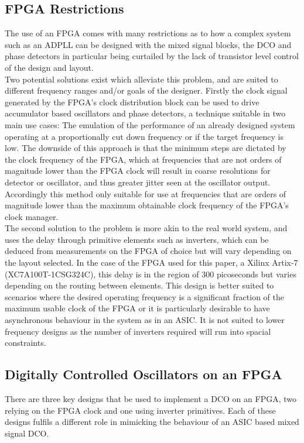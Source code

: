 \documentclass[conference]{IEEEtran}
\begin{document}
\subsection{FPGA Restrictions}
The use of an FPGA comes with many restrictions as to how a complex system such as an ADPLL can be designed with the mixed signal blocks, the DCO and phase detectors in particular being curtailed by the lack of transistor level control of the design and layout.\\
Two potential solutions exist which alleviate this problem, and are suited to different frequency ranges and/or goals of the designer. Firstly the clock signal generated by the FPGA's clock distribution block can be used to drive accumulator based oscillators and phase detectors, a technique suitable in two main use cases: The emulation of the performance of an already designed system operating at a proportionally cut down frequency or if the target frequency is low. 
The downside of this approach is that the minimum steps are dictated by the clock frequency of the FPGA, which at frequencies that are not orders of magnitude lower than the FPGA clock will result in coarse resolutions for detector or oscillator, and thus greater jitter seen at the oscillator output.
Accordingly this method only suitable for use at frequencies that are orders of magnitude lower than the maximum obtainable clock frequency of the FPGA's clock manager.\\
The second solution to the problem is more akin to the real world system, and uses the delay through primitive elements such as inverters, which can be deduced from measurements on the FPGA of choice but will vary depending on the layout selected. In the case of the FPGA used for this paper, a Xilinx Artix-7 (XC7A100T-1CSG324C), this delay is in the region of 300 picoseconds but varies depending on the routing between elements. This design is better suited to scenarios where the desired operating frequency is a significant fraction of the maximum usable clock of the FPGA or it is particularly desirable to have asynchronous behaviour in the system as in an ASIC. It is not suited to lower frequency designs as the number of inverters required will run into spacial constraints.
\subsection{Digitally Controlled Oscillators on an FPGA}
There are three key designs that be used to implement a DCO on an FPGA, two relying on the FPGA clock and one using inverter primitives. Each of these designs fulfils a different role in mimicking the behaviour of an ASIC based mixed signal DCO.
\end{document}
